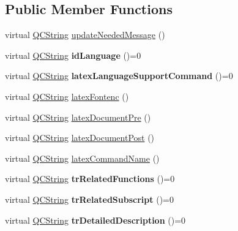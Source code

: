 \subsection*{Public Member Functions}
\begin{DoxyCompactItemize}
\item 
virtual \mbox{\hyperlink{class_q_c_string}{Q\+C\+String}} \mbox{\hyperlink{class_translator_a8841e027d8a0e661d0cef7e06d75c22a}{update\+Needed\+Message}} ()
\item 
\mbox{\label{class_translator_af1d1a225ccc757c51c6cecfeda886b93}} 
virtual \mbox{\hyperlink{class_q_c_string}{Q\+C\+String}} {\bfseries id\+Language} ()=0
\item 
\mbox{\label{class_translator_aa2cff88fa1aa000c9f5efe2ac12c4448}} 
virtual \mbox{\hyperlink{class_q_c_string}{Q\+C\+String}} {\bfseries latex\+Language\+Support\+Command} ()=0
\item 
virtual \mbox{\hyperlink{class_q_c_string}{Q\+C\+String}} \mbox{\hyperlink{class_translator_a573b483369d8d7cf7d85831a9da356be}{latex\+Fontenc}} ()
\item 
virtual \mbox{\hyperlink{class_q_c_string}{Q\+C\+String}} \mbox{\hyperlink{class_translator_a9fe33a516bc0ec6825a967294dd5d686}{latex\+Document\+Pre}} ()
\item 
virtual \mbox{\hyperlink{class_q_c_string}{Q\+C\+String}} \mbox{\hyperlink{class_translator_a4bcba7a46f227760b534b35760688da6}{latex\+Document\+Post}} ()
\item 
virtual \mbox{\hyperlink{class_q_c_string}{Q\+C\+String}} \mbox{\hyperlink{class_translator_a9e87df46e59ca15713f43205aeb17ea0}{latex\+Command\+Name}} ()
\item 
\mbox{\label{class_translator_af90d4efa4402e01bd8212af18b6a2c05}} 
virtual \mbox{\hyperlink{class_q_c_string}{Q\+C\+String}} {\bfseries tr\+Related\+Functions} ()=0
\item 
\mbox{\label{class_translator_a766626cb6f268088fec86e9d3c20b2f3}} 
virtual \mbox{\hyperlink{class_q_c_string}{Q\+C\+String}} {\bfseries tr\+Related\+Subscript} ()=0
\item 
\mbox{\label{class_translator_a6f0826040d05174e350c90920651bf45}} 
virtual \mbox{\hyperlink{class_q_c_string}{Q\+C\+String}} {\bfseries tr\+Detailed\+Description} ()=0

\end{DoxyCompactItemize}

